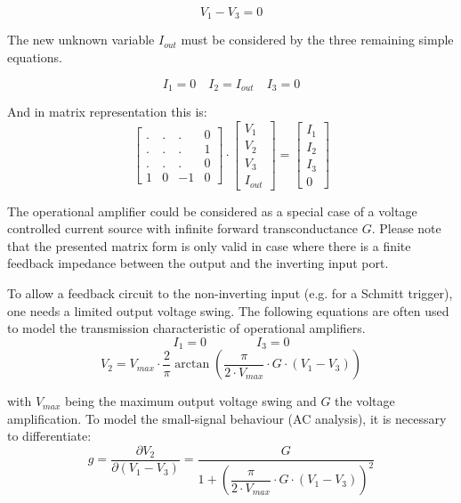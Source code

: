 \begin{equation}
V_{1} - V_{3} = 0
\label{eq:opamp}
\end{equation}

The new unknown variable $I_{out}$ must be considered by the three
remaining simple equations.

\begin{equation}
I_{1} = 0 \quad I_{2} = I_{out} \quad I_{3} = 0
\end{equation}

And in matrix representation this is:
\begin{equation}
\begin{bmatrix}
.&.&.& 0\\
.&.&.& 1\\
.&.&.& 0\\
1 & 0 & -1 & 0
\end{bmatrix}
\cdot
\begin{bmatrix}
V_{1}\\
V_{2}\\
V_{3}\\
I_{out}
\end{bmatrix}
=
\begin{bmatrix}
I_{1}\\
I_{2}\\
I_{3}\\
0
\end{bmatrix}
\end{equation}

The operational amplifier could be considered as a special case of a
voltage controlled current source with infinite forward
transconductance $G$.  Please note that the presented matrix form is
only valid in case where there is a finite feedback impedance
between the output and the inverting input port.

\addvspace{12pt}

To allow a feedback circuit to the non-inverting input (e.g.  for a
Schmitt trigger), one needs a limited output voltage swing.  The
following equations are often used to model the transmission
characteristic of operational amplifiers.
\begin{equation}
I_1 = 0 \qquad\qquad I_3 = 0
\end{equation}
\begin{equation}
\label{eq:OPVout}
V_2 = V_{max}\cdot\dfrac{2}{\pi}\arctan \left( \dfrac{\pi}{2\cdot V_{max}}\cdot G\cdot (V_1-V_3) \right)
\end{equation}

with $V_{max}$ being the maximum output voltage swing and $G$ the
voltage amplification.  To model the small-signal behaviour (AC
analysis), it is necessary to differentiate:
\begin{equation}
g = \dfrac{\partial V_2}{\partial (V_1-V_3)}
  = \dfrac{G}{1+\left( \dfrac{\pi}{2\cdot V_{max}}\cdot G\cdot (V_1-V_3) \right)^2}
\end{equation}

